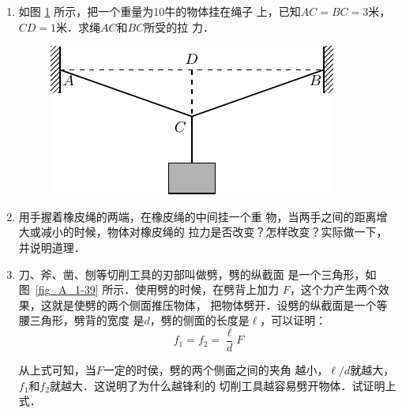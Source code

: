 \begin{enumerate}
\item 如图 \ref{fig_A_1-38} 所示，把一个重量为10牛的物体挂在绳子
上，已知$AC=BC=3$米，$CD=1$米．求绳$AC$和$BC$所受的拉
力．
\begin{figure} [htp]
\centering
\includegraphics{fig/A/1-38.pdf}
\caption{} \label{fig_A_1-38} 
\end{figure} 


\item   用手握着橡皮绳的两端，在橡皮绳的中间挂一个重
物，当两手之间的距离增大或减小的时候，物体对橡皮绳的
拉力是否改变？怎样改变？实际做一下，并说明道理．

\item  刀、斧、凿、刨等切削工具的刃部叫做劈，劈的纵截面
是一个三角形，如图~\ref{fig_A_1-39} 所示．使用劈的时候，在劈背上加力
$F$，这个力产生两个效果，这就是使劈的两个侧面推压物体，
把物体劈开．设劈的纵截面是一个等腰三角形，劈背的宽度
是$d$，劈的侧面的长度是$\ell$，可以证明：
\[f_1=f_2=\frac{\ell} {d} F \]

从上式可知，当$F$一定的时侯，劈的两个侧面之间的夹角
越小，$\ell/d$就越大，$f_1$和$f_2$就越大．这说明了为什么越锋利的
切削工具越容易劈开物体．试证明上式．




\end{enumerate}
